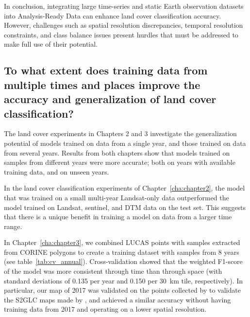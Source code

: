         In conclusion, integrating large time-series and static Earth observation datasets into Analysis-Ready Data can enhance land cover classification accuracy. However, challenges such as spatial resolution discrepancies, temporal resolution constraints, and class balance issues present hurdles that must be addressed to make full use of their potential.
            
    \subsection{To what extent does training data from multiple times and places improve the accuracy and generalization of land cover classification?}
    \label{syn:rq2}
    
        The land cover experiments in Chapters 2 and 3 investigate the generalization potential of models trained on data from a single year, and those trained on data from several years. Results from both chapters show that models trained on samples from different years were more accurate; both on years with available training data, and on unseen years.

        In the land cover classification experiments of Chapter~\ref{cha:chapter2}, the model that was trained on a small multi-year Landsat-only data outperformed the model trained on Landsat, sentinel, and DTM data on the test set. This suggests that there is a unique benefit in training a model on data from a larger time range.
        
        In Chapter~\ref{cha:chapter3}, we combined LUCAS points with samples extracted from CORINE polygons to create a training dataset with samples from 8 years (see table~\ref{tab:cv_annual}). Cross-validation showed that the weighted F1-score of the model was more consistent through time than through space (with standard deviations of 0.135 per year and 0.150 per 30~km tile, respectively). 
        In particular, our map of 2017 was validated on the points collected by \citep{jenerowicz2021validation} to validate the S2GLC maps made by \citet{malinowski2020automated}, and achieved a similar accuracy without having training data from 2017 and operating on a lower spatial resolution.

